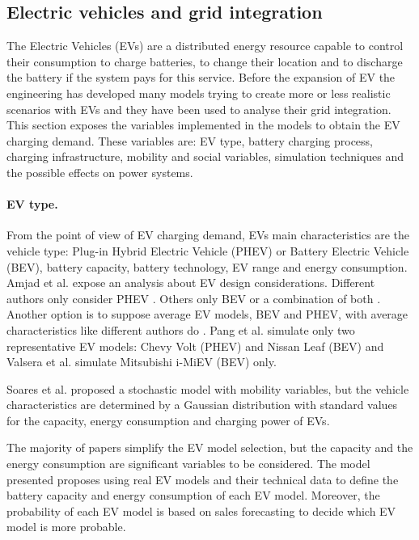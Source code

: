 \documentclass[a4paper,11pt,twoside,openright]{report}
\begin{document}
\subsection{Electric vehicles and grid integration}
The Electric Vehicles (EVs) are a distributed energy resource capable to control their consumption to charge batteries, to change their location and to discharge the battery if the system pays for this service. Before the expansion of EV the engineering has developed many models trying to create more or less realistic scenarios with EVs and they have been used to analyse their grid integration. This section exposes the variables implemented in the models to obtain the EV charging demand. These variables are: EV type, battery charging process, charging infrastructure, mobility and social variables, simulation techniques and the possible effects on power systems. 

\paragraph{EV type.}

From the point of view of EV charging demand, EVs main characteristics are the vehicle type: Plug-in Hybrid Electric Vehicle (PHEV) or Battery Electric Vehicle (BEV), battery capacity, battery technology, EV range and energy consumption. Amjad et al. \cite{Amjad2010} expose an  analysis about EV design considerations. Different authors only consider PHEV \cite{Watts-Transp,Clement2010,Peng2012,Chan2011,Sikai2010,Sortomme2011,Wang2011,Waraich2013}. Others only BEV \cite{Rahman1993,Valsera2011,Icai2010,Druitt2012,Loisel2014} or a combination of both \cite{Lyon2012,MaitraCIRED2009,Lopes2009Management,Soares2011}. Another option is to suppose average EV models, BEV and PHEV, with average characteristics like different authors do \cite{Watts-Transp,Icai2010,Soares2012}. Pang et al. \cite{Pang2012} simulate only two representative EV models: Chevy Volt (PHEV) and Nissan Leaf (BEV) and Valsera et al. \cite{Valsera2011} simulate Mitsubishi i-MiEV (BEV) only.

Soares et al. \cite{Soares2011} proposed a stochastic model with mobility variables, but the vehicle characteristics are determined by a Gaussian distribution with standard values for the capacity, energy consumption and charging power of EVs. 

The majority of papers simplify the EV model selection, but the capacity and the energy consumption are significant variables to be considered. The model presented proposes using real EV models and their technical data to define the battery capacity and energy consumption of each EV model. Moreover, the probability of each EV model is based on sales forecasting  \cite{EV_Forecast_FandS} to decide which EV model is more probable.
\end{document}
